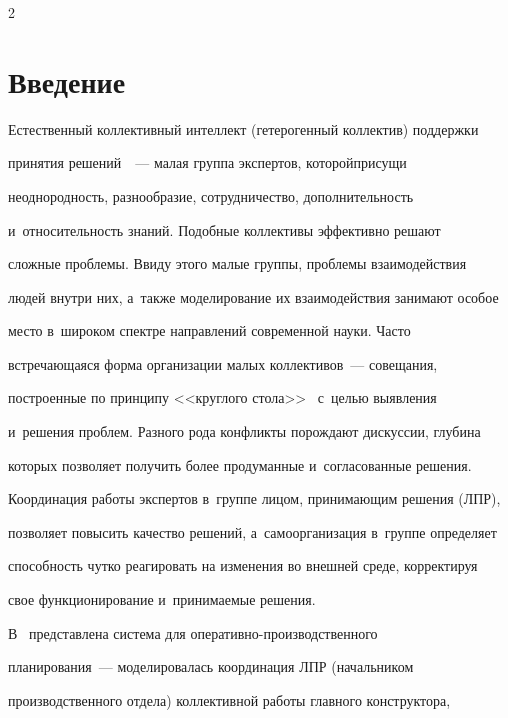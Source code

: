 \begin{multicols}{2}



\label{st\stat}



\section{Введение}



  Естественный коллективный интеллект (ге\-терогенный коллектив) поддержки 

принятия ре\-шений~\cite{1-r}~--- малая группа экспертов, которой\linebreak присущи 

неоднородность, разнообразие, со\-труд\-ничество, дополнительность 

и~относительность знаний. Подобные коллективы эффективно решают 

сложные проблемы. Ввиду этого малые группы, проблемы взаимодействия 

людей внутри них, а~также моделирование их взаимодействия занимают особое 

место в~широком спектре направлений современной науки. Часто 

встречающаяся форма организации малых коллективов~--- совещания, 

построенные по принципу <<круглого стола>>~\cite{3-r} \mbox{с~целью} выявления 

и~решения проб\-лем. Разного рода конфликты порождают дискуссии, глубина 

которых позволяет получить более продуманные и~согласованные решения. 

Координация работы экспертов в~группе лицом, принимающим решения (ЛПР), 

позволяет повысить качество решений, а~самоорганизация в~группе определяет 

способность чутко реагировать на изменения во внешней среде, корректируя 

свое функционирование и~при\-ни\-ма\-емые решения. 

  

  В~\cite{2-r} представлена система для опе\-ра\-тив\-но-про\-из\-вод\-ст\-вен\-но\-го 

планирования~--- моделировалась координация ЛПР (начальником 

производственного отдела) коллективной работы главного конструктора, 


\end{multicols}
